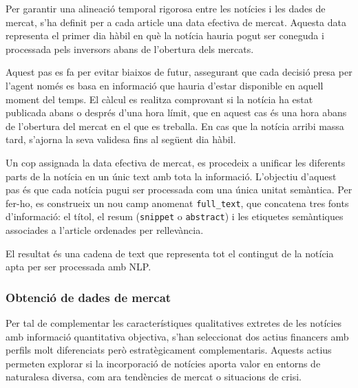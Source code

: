 \documentclass[12pt,a4paper,twoside]{book}
\begin{document}
Per garantir una alineació temporal rigorosa entre les notícies i les dades de mercat, s'ha definit per a cada article una data efectiva de mercat. Aquesta data representa el primer dia hàbil en què la notícia hauria pogut ser coneguda i processada pels inversors abans de l'obertura dels mercats.

Aquest pas es fa per evitar biaixos de futur, assegurant que cada decisió presa per l'agent només es basa en informació que hauria d'estar disponible en aquell moment del temps. El càlcul es realitza comprovant si la notícia ha estat publicada abans o després d'una hora límit, que en aquest cas és una hora abans de l'obertura del mercat en el que es treballa. En cas que la notícia arribi massa tard, s'ajorna la seva validesa fins al següent dia hàbil.

Un cop assignada la data efectiva de mercat, es procedeix a unificar les diferents parts de la notícia en un únic text amb tota la informació. L'objectiu d'aquest pas és que cada notícia pugui ser processada com una única unitat semàntica. Per fer-ho, es construeix un nou camp anomenat \texttt{full\_text}, que concatena tres fonts d'informació: el títol, el resum (\texttt{snippet} o \texttt{abstract}) i les etiquetes semàntiques associades a l'article ordenades per rellevància.

El resultat és una cadena de text que representa tot el contingut de la notícia apta per ser processada amb NLP.


\subsubsection{Obtenció de dades de mercat}

Per tal de complementar les característiques qualitatives extretes de les notícies amb informació quantitativa objectiva, s'han seleccionat dos actius financers amb perfils molt diferenciats però estratègicament complementaris. Aquests actius permeten explorar si la incorporació de notícies aporta valor en entorns de naturalesa diversa, com ara tendències de mercat o situacions de crisi.
\end{document}
